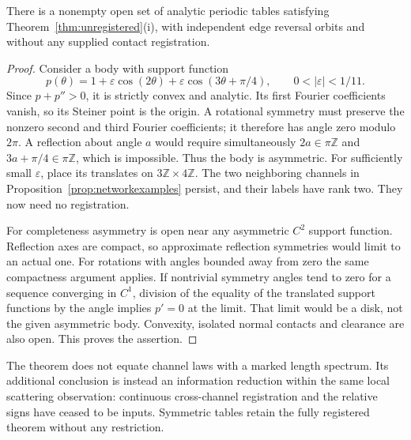 \begin{proposition}
\label{prop:asymmetricphysical}
There is a nonempty open set of analytic periodic tables satisfying
Theorem~\ref{thm:unregistered}(i), with independent edge reversal orbits
and without any supplied contact registration.
\end{proposition}
\begin{proof}
Consider a body with support function
\begin{equation}\label{eq:asymmetricsupport}
 p(\theta)=1+\varepsilon\cos(2\theta)
              +\varepsilon\cos(3\theta+\pi/4),\qquad
                 0<|\varepsilon|<1/11.
\end{equation}
Since $p+p''>0$, it is strictly convex and analytic. Its first Fourier
coefficients vanish, so its Steiner point is the origin. A rotational
symmetry must preserve the nonzero second and third Fourier coefficients;
it therefore has angle zero modulo $2\pi$. A reflection about angle $a$
would require simultaneously $2a\in\pi\mathbb Z$ and
$3a+\pi/4\in\pi\mathbb Z$, which is impossible. Thus the body is asymmetric.
For sufficiently small $\varepsilon$, place its translates on
$3\mathbb Z\times4\mathbb Z$. The two neighboring channels in
Proposition~\ref{prop:networkexamples} persist, and their labels have
rank two. They now need no registration.

For completeness asymmetry is open near any asymmetric $C^2$ support
function. Reflection axes are compact, so approximate reflection
symmetries would limit to an actual one. For rotations with angles
bounded away from zero the same compactness argument applies. If
nontrivial symmetry angles tend to zero for a sequence converging in
$C^1$, division of the equality of the translated support functions
by the angle implies $p'=0$ at the limit. That limit would be a disk,
not the given asymmetric body. Convexity, isolated normal contacts and
clearance are also open. This proves the assertion.
\end{proof}

The theorem does not equate channel laws with a marked length spectrum.
Its additional conclusion is instead an information reduction within
the same local scattering observation: continuous cross-channel
registration and the relative signs have ceased to be inputs. Symmetric
tables retain the fully registered theorem without any restriction.
